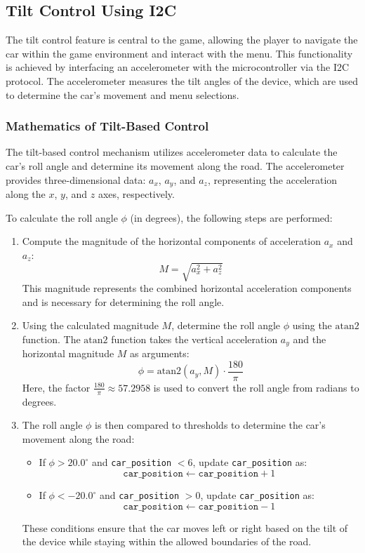 \documentclass[conference]{IEEEtran}
\begin{document}
\subsection{Tilt Control Using I2C}
The tilt control feature is central to the game, allowing the player to navigate the car within the game environment and interact with the menu. This functionality is achieved by interfacing an accelerometer with the microcontroller via the I2C protocol. The accelerometer measures the tilt angles of the device, which are used to determine the car's movement and menu selections.

\subsubsection{Mathematics of Tilt-Based Control}
The tilt-based control mechanism utilizes accelerometer data to calculate the car's roll angle and determine its movement along the road. The accelerometer provides three-dimensional data: $a_x$, $a_y$, and $a_z$, representing the acceleration along the $x$, $y$, and $z$ axes, respectively. 

To calculate the roll angle $\phi$ (in degrees), the following steps are performed:
\begin{enumerate}
    \item Compute the magnitude of the horizontal components of acceleration $a_x$ and $a_z$:
    \begin{equation}
    M = \sqrt{a_x^2 + a_z^2}
    \end{equation}
    This magnitude represents the combined horizontal acceleration components and is necessary for determining the roll angle.

    \item Using the calculated magnitude $M$, determine the roll angle $\phi$ using the $\text{atan2}$ function. The $\text{atan2}$ function takes the vertical acceleration $a_y$ and the horizontal magnitude $M$ as arguments:
    \begin{equation}
    \phi = \text{atan2}(a_y, M) \cdot \frac{180}{\pi}
    \end{equation}
    Here, the factor $\frac{180}{\pi} \approx 57.2958$ is used to convert the roll angle from radians to degrees.

    \item The roll angle $\phi$ is then compared to thresholds to determine the car's movement along the road:
\begin{itemize}
    \item If $\phi > 20.0^\circ$ and \texttt{car\_position} $< 6$, update \texttt{car\_position} as: 
    \[
    \texttt{car\_position} \leftarrow \texttt{car\_position} + 1
    \]
    \item If $\phi < -20.0^\circ$ and \texttt{car\_position} $> 0$, update \texttt{car\_position} as: 
    \[
    \texttt{car\_position} \leftarrow \texttt{car\_position} - 1
    \]
\end{itemize}

    These conditions ensure that the car moves left or right based on the tilt of the device while staying within the allowed boundaries of the road.
\end{enumerate}
\end{document}
